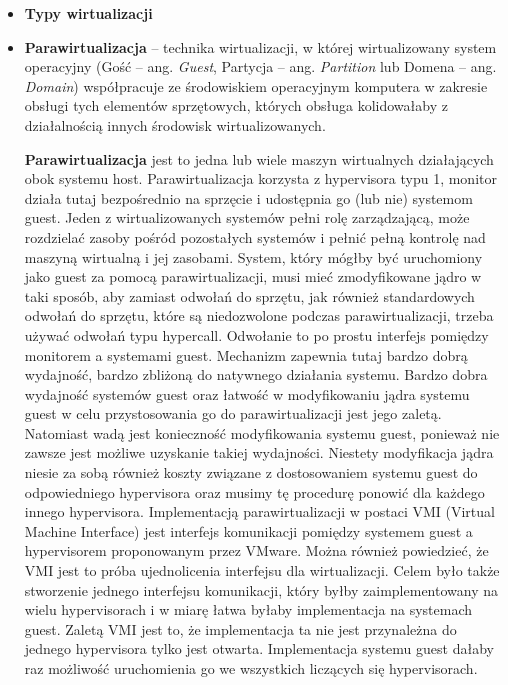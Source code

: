 \begin{itemize}
	\setlength\itemsep{1pt}
	\item[] \textbf{Typy wirtualizacji}
	\item \textbf{Parawirtualizacja} – technika wirtualizacji, w której wirtualizowany system operacyjny (Gość – ang. \textit{Guest}, Partycja – ang. \textit{Partition} lub Domena – ang. \textit{Domain}) współpracuje ze środowiskiem operacyjnym komputera w zakresie obsługi tych elementów sprzętowych, których obsługa kolidowałaby z działalnością innych środowisk wirtualizowanych.
	
	\textbf{Parawirtualizacja} jest to jedna lub wiele maszyn wirtualnych działających obok systemu host. Parawirtualizacja korzysta z hypervisora typu 1, monitor działa tutaj bezpośrednio na sprzęcie i udostępnia go (lub nie) systemom guest. Jeden z wirtualizowanych systemów pełni rolę zarządzającą, może rozdzielać zasoby pośród pozostałych systemów i pełnić pełną kontrolę nad maszyną wirtualną i jej zasobami. System, który mógłby być uruchomiony jako guest za pomocą parawirtualizacji, musi mieć zmodyfikowane jądro w taki sposób, aby zamiast odwołań do sprzętu, jak również standardowych odwołań do sprzętu, które są niedozwolone podczas parawirtualizacji, trzeba używać odwołań typu hypercall. Odwołanie to po prostu interfejs pomiędzy monitorem a systemami guest. Mechanizm zapewnia tutaj bardzo dobrą wydajność, bardzo zbliżoną do natywnego działania systemu. Bardzo dobra wydajność systemów guest oraz łatwość w modyfikowaniu jądra systemu guest w celu przystosowania go do parawirtualizacji jest jego zaletą. Natomiast wadą jest konieczność modyfikowania systemu guest, ponieważ nie zawsze jest możliwe uzyskanie takiej wydajności. Niestety modyfikacja jądra niesie za sobą również koszty związane z dostosowaniem systemu guest do odpowiedniego hypervisora oraz musimy tę procedurę ponowić dla każdego innego hypervisora. Implementacją parawirtualizacji w postaci VMI (Virtual Machine Interface) jest interfejs komunikacji pomiędzy systemem guest a hypervisorem proponowanym przez VMware. Można również powiedzieć, że VMI jest to próba ujednolicenia interfejsu dla wirtualizacji. Celem było także stworzenie jednego interfejsu komunikacji, który byłby zaimplementowany na wielu hypervisorach i w miarę łatwa byłaby implementacja na systemach guest. Zaletą VMI jest to, że implementacja ta nie jest przynależna do jednego hypervisora tylko jest otwarta. Implementacja systemu guest dałaby raz możliwość uruchomienia go we wszystkich liczących się hypervisorach.
	

\end{itemize}
